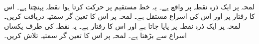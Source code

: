 \\
لمحہ  پر ایک ذرہ نقطہ  پر واقع ہے۔ یہ خط مستقیم پر حرکت کرتا ہوا نقطہ  پہنچتا ہے۔ اس کا رفتار  پر  اور  اس کی اسراع مستقل  ہے۔ لمحہ  پر اس کا تعین گر سمتیہ  دریافت کریں۔
لمحہ  پر ایک ذرہ نقطہ  پر پایا جاتا ہے  اور  اس کا رفتار  ہے۔ یہ نقطہ  کی طرف یکساں اسراع  سے بڑھتا ہے۔ لمحہ  پر اس کا تعین گر سمتیہ  تلاش کریں۔

